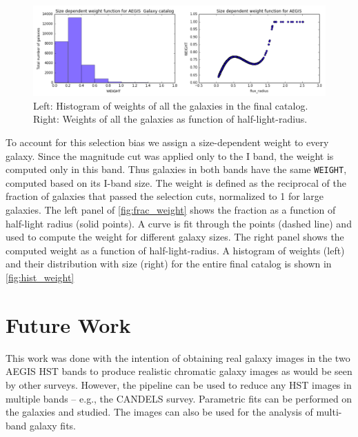 \documentclass[a4paper,11pt]{article}
\begin{document}
\begin{figure}[h]
\centering\includegraphics[width=1.\linewidth]{hist_weight.png}
\caption{Left: Histogram of weights of all the galaxies in the final catalog. 
Right: Weights of all the galaxies as function of half-light-radius.
}
\label{fig:hist_weight}
\end{figure}

To account for this selection bias we assign a size-dependent weight to every galaxy. Since the magnitude cut was applied only to the I band, the weight is computed only in this band. Thus galaxies in both bands have the same {\tt WEIGHT}, computed based on its I-band size. The weight is defined as the reciprocal of the fraction of galaxies that passed the selection cuts, normalized to 1 for large galaxies. The left panel of \autoref{fig:frac_weight} shows the fraction as a function of half-light radius (solid points). A curve is fit through the points (dashed line) and used to compute the weight for different galaxy sizes. The right panel shows the computed weight as a function of half-light-radius. A histogram of weights (left) and their distribution with size (right) for the entire final catalog is shown in \autoref{fig:hist_weight}


\section{Future Work}
This work was done with the intention of obtaining real galaxy images in the two AEGIS HST bands to produce realistic chromatic galaxy images as would be seen by other surveys. However, the pipeline can be used to reduce any HST images in multiple bands -- e.g., the CANDELS survey. Parametric fits can be performed on the galaxies and studied. The images can also be used for the analysis of multi-band galaxy fits.
\end{document}

